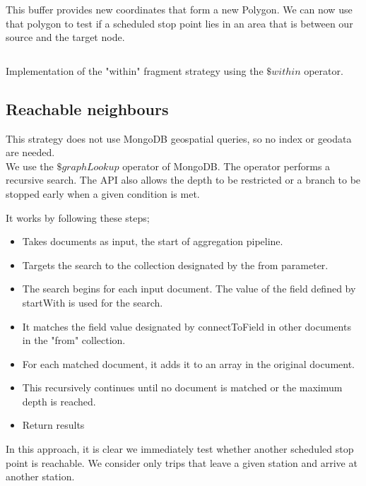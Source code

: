 This buffer provides new coordinates that form a new Polygon. We can now use that polygon to test if a scheduled stop point lies in an area that is between our source and the target node.

\begin{listing}[H]
    \inputminted[linenos,frame=single,breaklines]{TypeScript}{code/within.ts}
    \caption{Implementation of the "within" fragment strategy using the $\$within$ operator.}
\end{listing}

\subsection{Reachable neighbours}
This strategy does not use MongoDB geospatial queries, so no index or geodata are needed. \\We use the $\$graphLookup$ \cite{noauthor_graphlookup_nodate} operator of MongoDB. The operator performs a recursive search. The API also allows the depth to be restricted or a branch to be stopped early when a given condition is met. 

It works by following these steps;
\begin{itemize}
    \item Takes documents as input, the start of aggregation pipeline.
    \item Targets the search to the collection designated by the from parameter.
    \item The search begins for each input document. The value of the field defined by startWith is used for the search.
    \item It matches the field value designated by connectToField in other documents in the "from" collection.
    \item For each matched document, it adds it to an array in the original document. 
    \item This recursively continues until no document is matched or the maximum depth is reached.
    \item Return results
\end{itemize}

In this approach, it is clear we immediately test whether another scheduled stop point is reachable. We consider only trips that leave a given station and arrive at another station.

